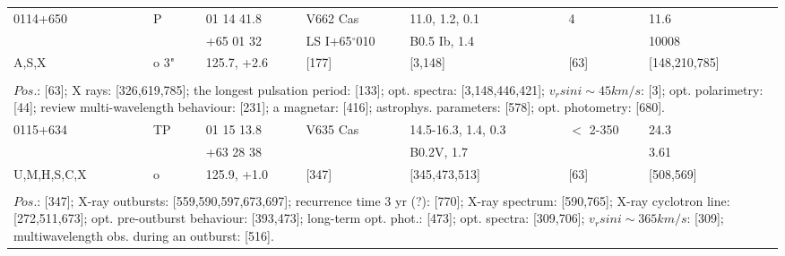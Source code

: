 \documentclass{aa}
\begin{document}
\begin{table*}[h]
\begin{tabular}{p{2.5cm}p{1cm}p{1.8cm}p{2.3cm}p{3.3cm}p{2.0cm}p{2.2cm}}
\noalign{\smallskip}
\hline
\noalign{\smallskip}
0114+650     & P        & 01 14 41.8            & V662 Cas                    & 11.0, 1.2, 0.1      &    4              &        11.6           \\
                       &            & +65 01 32             & LS I+65$^\circ$010   & B0.5 Ib, 1.4        &                    &     10008    \\
A,S,X            &  o 3"   & 125.7, +2.6           &     [177]                        &    [3,148]              &    [63]         &  [148,210,785]      \\
\\
\multicolumn{7}{p{17.5cm}}{
$Pos$.: [63]; X rays: [326,619,785]; the longest pulsation period: [133]; opt. spectra: [3,148,446,421]; 
$v_rsin i \sim 45 km/s$: [3]; opt. polarimetry: [44]; review multi-wavelength behaviour: [231]; a magnetar: [416]; 
astrophys. parameters: [578]; opt. photometry: [680].}\\

\noalign{\smallskip}
\hline
\noalign{\smallskip}
0115+634     &   TP     & 01 15 13.8           & V635 Cas       & 14.5-16.3, 1.4, 0.3         &    $<$ 2-350      &  24.3            \\
                      &              & +63 28 38            &                           & B0.2V, 1.7                      &                            &  3.61           \\
U,M,H,S,C,X   &  o     & 125.9, +1.0          &     [347]             &    [345,473,513]             &        [63]             &  [508,569]  \\
\\
\multicolumn{7}{p{17.5cm}}{
$Pos$.: [347]; X-ray outbursts: [559,590,597,673,697]; recurrence time 3 yr (?): [770]; X-ray spectrum: [590,765];
X-ray cyclotron line: [272,511,673]; opt. pre-outburst behaviour: [393,473]; long-term opt. phot.: [473]; 
opt. spectra: [309,706]; $v_rsin i \sim 365 km/s$: [309]; multiwavelength obs. during an outburst: [516].}\\


\end{tabular}
\end{table*}
\end{document}
